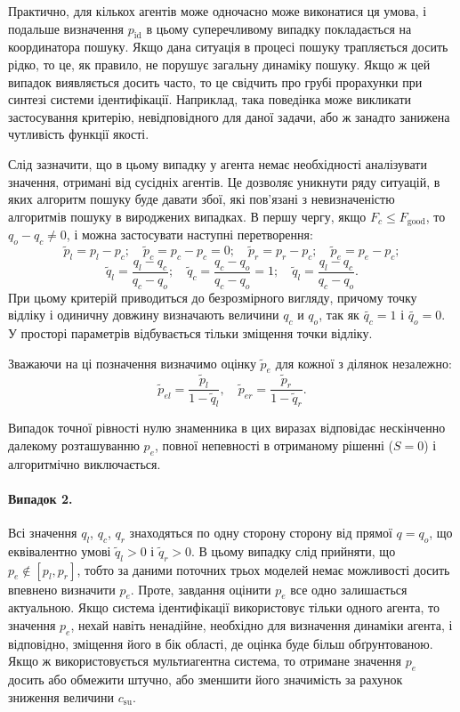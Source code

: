 Практично, для кількох агентів може одночасно може виконатися
ця умова, і подальше визначення
$ p_\mathrm{id} $ в цьому суперечливому випадку покладається на
координатора пошуку. Якщо дана ситуація в процесі пошуку
трапляється досить рідко, то це, як правило, не порушує загальну
динаміку пошуку. Якщо ж цей випадок виявляється досить часто,
то це свідчить про грубі прорахунки при синтезі системи
ідентифікації. Наприклад, така поведінка може викликати
застосування критерію, невідповідного для даної задачи,
або ж занадто занижена чутливість функції якості.

Слід зазначити, що в цьому випадку у агента немає необхідності
аналізувати значення, отримані від сусідніх агентів. Це дозволяє
уникнути ряду ситуацій, в яких алгоритм пошуку буде давати
збої, які пов'язані з невизначеністю алгоритмів пошуку в вироджених
випадках.
%
В першу чергу, якщо
$F_c \le F_\mathrm{good}$, то $q_o -q_c \ne 0$,
і можна застосувати наступні перетворення:
%
\[
  \tilde{p}_l = p_l - p_c;
  \quad
  \tilde{p}_c = p_c - p_c = 0;
  \quad
  \tilde{p}_r = p_r - p_c;
  \quad
  \tilde{p}_e = p_e - p_c;
\]
%
\begin{equation}
  \tilde{q}_l = \frac{q_l-q_c}{q_c-q_o};
  \quad
  \tilde{q}_c = \frac{q_c-q_o}{q_c-q_o} = 1;
  \quad
  \tilde{q}_l = \frac{q_l-q_c}{q_c-q_o}.
  \label{atu:eq:q_agent_rel}
\end{equation}
%
При цьому критерій приводиться до безрозмірного вигляду,
причому точку відліку і одиничну довжину визначають величини
$q_c$ и $q_o$, так як $\tilde{q_c} = 1$ і $\tilde{q_o} = 0$.
У просторі параметрів відбувається тільки зміщення точки відліку.

Зважаючи на ці позначення визначимо оцінку
$\tilde{p}_e$
для кожної з ділянок незалежно:
%
\begin{equation}
  \tilde{p}_{el} = \frac{\tilde{p}_l}{1-\tilde{q}_l},
  \quad
  \tilde{p}_{er} = \frac{\tilde{p}_r}{1-\tilde{q}_r}.
  \label{atu:eq:pr_ex}
\end{equation}

Випадок точної рівності нулю знаменника в цих виразах відповідає нескінченно
далекому розташуванню $p_e$, повної непевності в отриманому рішенні ($S = 0$)
і алгоритмічно виключається.


\paragraph{Випадок 2.} %
%
Всі значення
$q_l $, $q_c $, $q_r $ знаходяться по одну сторону сторону від прямої
$q = q_o$, що еквівалентно умові
$\tilde{q}_l> 0 $ і $\tilde{q}_r> 0 $.
В цьому випадку слід прийняти, що
$p_e \notin [p_l, p_r] $, тобто за даними поточних трьох моделей немає
можливості досить впевнено визначити
$ p_e $. Проте, завдання оцінити
$ p_e $ все одно залишається актуальною. Якщо система ідентифікації
використовує тільки одного агента, то значення
$ p_e $, нехай навіть ненадійне, необхідно для визначення динаміки
агента, і відповідно, зміщення його в бік області, де оцінка буде
більш обґрунтованою. Якщо ж використовується мультиагентна
система, то отримане значення
$ p_e $ досить або обмежити штучно, або зменшити його значимість
за рахунок зниження величини
$ c_\mathrm{su} $.

